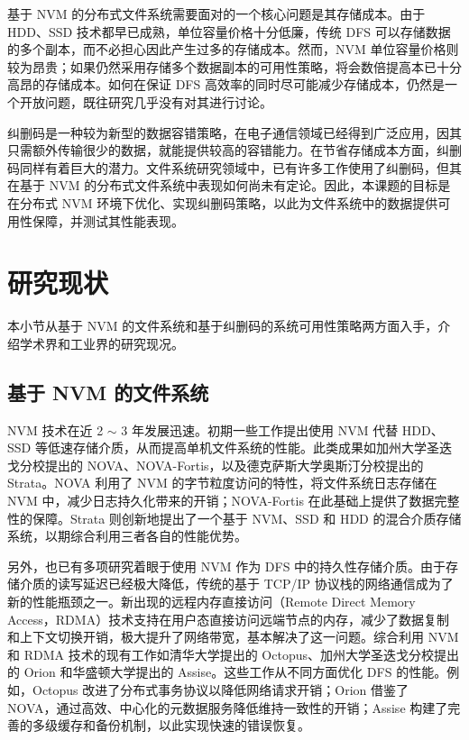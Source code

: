 基于 NVM 的分布式文件系统需要面对的一个核心问题是其存储成本。由于 HDD、SSD 技术都早已成熟，单位容量价格十分低廉，传统 DFS 可以存储数据的多个副本，而不必担心因此产生过多的存储成本。然而，NVM 单位容量价格则较为昂贵；如果仍然采用存储多个数据副本的可用性策略，将会数倍提高本已十分高昂的存储成本。如何在保证 DFS 高效率的同时尽可能减少存储成本，仍然是一个开放问题，既往研究几乎没有对其进行讨论。

纠删码是一种较为新型的数据容错策略，在电子通信领域已经得到广泛应用，因其只需额外传输很少的数据，就能提供较高的容错能力。在节省存储成本方面，纠删码同样有着巨大的潜力。文件系统研究领域中，已有许多工作使用了纠删码，但其在基于 NVM 的分布式文件系统中表现如何尚未有定论。因此，本课题的目标是在分布式 NVM 环境下优化、实现纠删码策略，以此为文件系统中的数据提供可用性保障，并测试其性能表现。

\section{研究现状}
\label{sec:ch1_relworks}

本小节从基于 NVM 的文件系统和基于纠删码的系统可用性策略两方面入手，介绍学术界和工业界的研究现况。

\subsection{基于 NVM 的文件系统}
\label{subsec:ch1_nvm_relworks}

NVM 技术在近 2 $\sim$ 3 年发展迅速。初期一些工作提出使用 NVM 代替 HDD、SSD 等低速存储介质，从而提高单机文件系统的性能。此类成果如加州大学圣迭戈分校提出的 NOVA\cite{nova2016}、NOVA-Fortis\cite{novafortis2017}，以及德克萨斯大学奥斯汀分校提出的 Strata\cite{strata2017}。NOVA 利用了 NVM 的字节粒度访问的特性，将文件系统日志存储在 NVM 中，减少日志持久化带来的开销；NOVA-Fortis 在此基础上提供了数据完整性的保障。Strata 则创新地提出了一个基于 NVM、SSD 和 HDD 的混合介质存储系统，以期综合利用三者各自的性能优势。

另外，也已有多项研究着眼于使用 NVM 作为 DFS 中的持久性存储介质。由于存储介质的读写延迟已经极大降低，传统的基于 TCP/IP 协议栈的网络通信成为了新的性能瓶颈之一。新出现的远程内存直接访问（Remote Direct Memory Access，RDMA）技术支持在用户态直接访问远端节点的内存，减少了数据复制和上下文切换开销，极大提升了网络带宽，基本解决了这一问题。综合利用 NVM 和 RDMA 技术的现有工作如清华大学提出的 Octopus\cite{octopus2017}、加州大学圣迭戈分校提出的 Orion\cite{orion2019} 和华盛顿大学提出的 Assise\cite{assise2019}。这些工作从不同方面优化 DFS 的性能。例如，Octopus 改进了分布式事务协议以降低网络请求开销；Orion 借鉴了 NOVA，通过高效、中心化的元数据服务降低维持一致性的开销；Assise 构建了完善的多级缓存和备份机制，以此实现快速的错误恢复。

